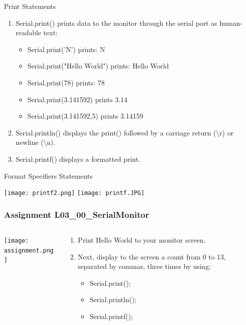 \documentclass{beamer}
\begin{document}
\begin{frame}{Print Statements}
\begin{enumerate}
\item Serial.print() prints data to the monitor through the serial port as human-readable text:
	\begin{itemize}
	\item Serial.print('N') prints: N
	\item Serial.print("Hello World") prints: Hello World
	\item Serial.print(78) prints: 78
	\item Serial.print(3.141592) prints 3.14
	\item Serial.print(3.141592,5) prints 3.14159
	\end{itemize}
\item Serial.println() displays the print() followed by a carriage return (\textbackslash r) or newline (\textbackslash n).
\item Serial.printf() displays a formatted print.
\end{enumerate}
\end{frame}


\begin{frame}{Format Specifiers Statements}
\begin{center}
	\texttt{[image: printf2.png]} 
	\texttt{[image: printf.JPG]} 
\end{center}

\lstpf
\end{frame}

\begin{frame}\frametitle{Assignment L03\_00\_SerialMonitor}
\begin{columns}
\begin{column}{4cm}
\begin{overprint}
\texttt{[image: assignment.png]}
\end{overprint}
\end{column}
\begin{column}{6cm}
\begin{enumerate}
\item Print Hello World to your monitor screen.
\item Next, display to the screen a count from 0 to 13, separated by commas, three times by using:
\begin{itemize}
\item Serial.print();
\item Serial.println();
\item Serial.printf();
\end{itemize}
\end{enumerate}
\end{column}
\end{columns}
\end{frame}
\end{document}
